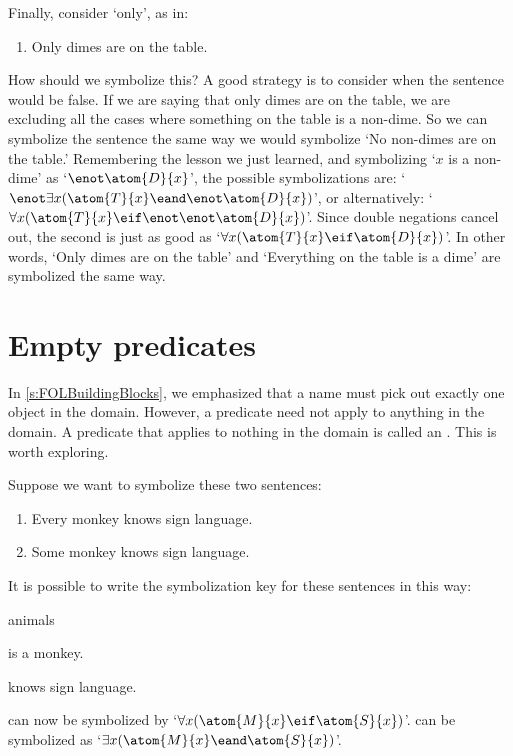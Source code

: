 
Finally, consider `only', as in:
\begin{enumerate}
	\item\label{quan5} Only dimes are on the table.
\end{enumerate}
How should we symbolize this?  A good strategy is to consider when the sentence would be false.  If we are saying that only dimes are on the table, we are excluding all the cases where something on the table is a non-dime.  So we can symbolize the sentence the same way we would symbolize `No non-dimes are on the table.' Remembering the lesson we just learned, and symbolizing `$x$ is a non-dime' as `$\enot \atom{D}{x}$', the possible symbolizations are: `$\enot\exists x(\atom{T}{x} \eand \enot \atom{D}{x})$', or alternatively: `$\forall x(\atom{T}{x} \eif \enot\enot \atom{D}{x})$'. Since double negations cancel out, the second is just as good as `$\forall x(\atom{T}{x} \eif \atom{D}{x})$'. In other words, `Only dimes are on the table' and `Everything on the table is a dime' are symbolized the same way.


\section{Empty predicates}

In \cref{s:FOLBuildingBlocks}, we emphasized that a name must pick out exactly one object in the domain. However, a predicate need not apply to anything in the domain. A predicate that applies to nothing in the domain is called an . This is worth exploring.


Suppose we want to symbolize these two sentences:
	\begin{enumerate}
		\item\label{monkey1} Every monkey knows sign language.
		\item\label{monkey2} Some monkey knows sign language.
	\end{enumerate}
It is possible to write the symbolization key for these sentences in this way:
	\begin{ekey}
		\item[\text{domain}] animals
		\item[\atom{M}{x}]  is a monkey.
		\item[\atom{S}{x}]  knows sign language.
	\end{ekey}
 can now be symbolized by `$\forall x(\atom{M}{x} \eif
\atom{S}{x})$'.  can be symbolized as `$\exists
x(\atom{M}{x} \eand \atom{S}{x})$'.

